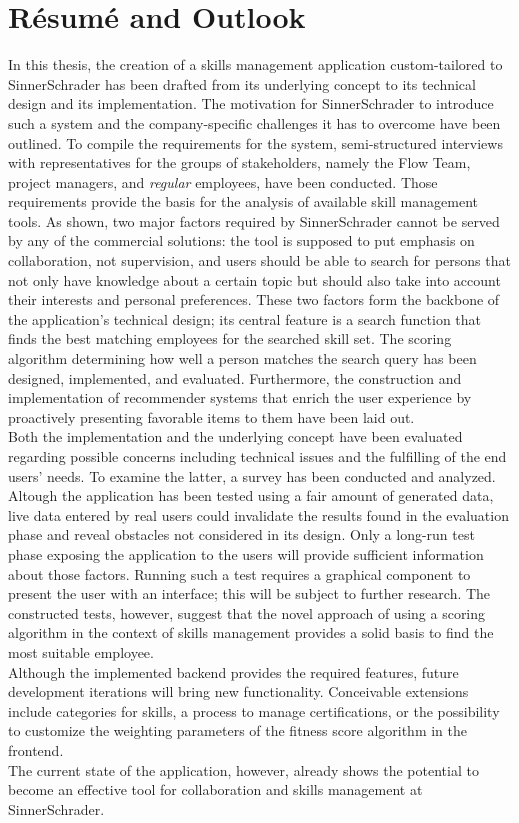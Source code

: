 \chapter{Résumé and Outlook}
In this thesis, the creation of a skills management application custom-tailored to SinnerSchrader has been drafted from its underlying concept to its technical design and its implementation. The motivation for SinnerSchrader to introduce such a system and the company-specific challenges it has to overcome have been outlined.
To compile the requirements for the system, semi-structured interviews with representatives for the groups of stakeholders, namely the Flow Team, project managers, and \textit{regular} employees, have been conducted. Those requirements provide the basis for the analysis of available skill management tools. As shown, two major factors required by SinnerSchrader cannot be served by any of the commercial solutions: the tool is supposed to put emphasis on collaboration, not supervision, and users should be able to search for persons that not only have knowledge about a certain topic but should also take into account their interests and personal preferences. These two factors form the backbone of the application's technical design; its central feature is a search function that finds the best matching employees for the searched skill set. The scoring algorithm determining how well a person matches the search query has been designed, implemented, and evaluated. Furthermore, the construction and implementation of recommender systems that enrich the user experience by proactively presenting favorable items to them have been laid out.\\
Both the implementation and the underlying concept have been evaluated regarding possible concerns including technical issues and the fulfilling of the end users' needs. To examine the latter, a survey has been conducted and analyzed.\\
Altough the application has been tested using a fair amount of generated data, live data entered by real users could invalidate the results found in the evaluation phase and reveal obstacles not considered in its design. Only a long-run test phase exposing the application to the users will provide sufficient information about those factors. Running such a test requires a graphical component to present the user with an interface; this will be subject to further research.
The constructed tests, however, suggest that the novel approach of using a scoring algorithm in the context of skills management provides a solid basis to find the
most suitable employee.\\
Although the implemented backend provides the required features, future development iterations will bring new functionality. Conceivable extensions include categories for skills, a process to manage certifications, or the possibility to customize the weighting parameters of the fitness score algorithm in the frontend.\\
The current state of the application, however, already shows the potential to become an effective tool for collaboration and skills management at SinnerSchrader.

